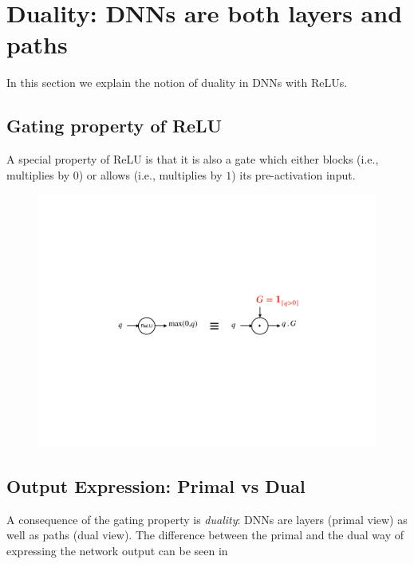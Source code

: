 \section{Duality: DNNs are both layers and paths}
In this section we explain the notion of duality in DNNs with ReLUs. 
\subsection{Gating property of ReLU}
A special property of ReLU is that it is also a gate which either blocks (i.e., multiplies by $0$) or allows (i.e., multiplies by $1$) its pre-activation input. 
\FloatBarrier
\begin{figure}[H]
\includegraphics[scale=0.4]{figs/gating.pdf}
\end{figure}
\subsection{Output Expression: Primal vs Dual}
A consequence of the gating property is \emph{duality}: DNNs are layers (primal view) as well as paths (dual view). The difference between the primal and the dual way of expressing the network output can be seen in 
\FloatBarrier
\begin{table}[H]
\caption{$\Theta(l),l=1,\ldots,d$ is the weight of layer $l$.}
\label{tb:primal-dual}
\end{table}

